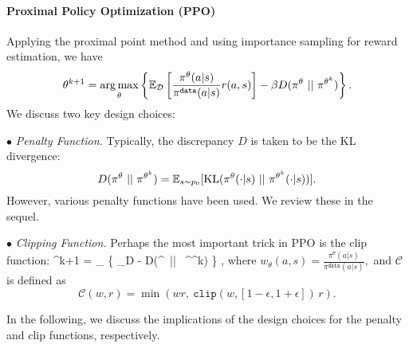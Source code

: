 \documentclass[11pt,letterpaper]{article}
\begin{document}
\paragraph{Proximal Policy Optimization (PPO)}

Applying the proximal point method and using importance sampling for reward estimation, we have
$$
\theta^{k+1} = \operatorname*{arg\,max}_{\theta} \left\{ \mathbb{E}_{\mathcal D} \left[ 
\frac{\pi^\theta(a|s)}{\pi^{\mathtt{data}}(a|s)}
r(a,s) \right] - \beta D(\pi^\theta~||~ \pi^{\theta^{k}}) \right\} .
$$
We discuss two key design choices: 

\noindent$\bullet$ \emph{Penalty Function.}  
Typically, the discrepancy $D$ is taken to be the KL divergence:
$$
D(\pi^\theta~||~ \pi^{\theta^{k}})
=  
\mathbb{E}_{s \sim p_0}[\mathrm{KL}(\pi^\theta(\cdot | s)~||~ \pi^{\theta^{k}}(\cdot | s))].
$$
However, various penalty functions have been used. We review these in the sequel.

\noindent$\bullet$ \emph{Clipping Function.}  
Perhaps the most important trick in PPO is the clip function:
\bb 
\theta^{k+1} = \argmax_{\theta} \left\{ \E_{\mathcal D}  - \beta D(\pi^\theta~||~ \pi^{\theta^{k}}) \right\} ,
\ee 
where 
$
w_\theta(a,s) = \frac{\pi^\theta(a|s)}{\pi^{\mathtt{data}}(a|s)},
$
and $\mathcal C$ is defined as
$$
\mathcal C(w, r) = \min(w r, ~ \mathtt{clip}(w, [1-\epsilon, 1+\epsilon]) \, r ).
$$

In the following, we discuss the implications of the design choices for the penalty and clip functions, respectively.




 

\end{document}

